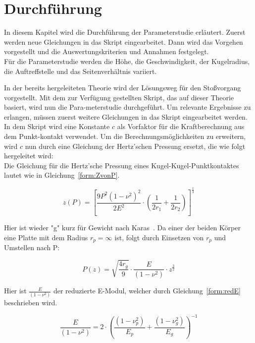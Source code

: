 \chapter{Durchführung}
\label{chap:Durchfuehrung}

In diesem Kapitel wird die Durchführung der Parameterstudie erläutert. Zuerst werden neue Gleichungen in das Skript eingearbeitet. Dann wird das Vorgehen vorgestellt und die Auswertungskriterien und Annahmen festgelegt.\\
Für die Parameterstudie werden die Höhe, die Geschwindigkeit, der Kugelradius, die Auftreffstelle und das Seitenverhältnis variiert.

In der bereits hergeleiteten Theorie wird der Lösungsweg für den Stoßvorgang vorgestellt. Mit dem zur Verfügung gestellten Skript, das auf dieser Theorie basiert, wird nun die Para-meterstudie durchgeführt. Um relevante Ergebnisse zu erlangen, müssen zuerst weitere Gleichungen in das Skript eingearbeitet werden.\\
In dem Skript wird eine Konstante $c$ als Vorfaktor für die Kraftberechnung aus dem Punkt-kontakt verwendet. Um die Berechnungsmöglichkeiten zu erweitern, wird $c$ nun durch eine Gleichung der Hertz'schen Pressung ersetzt, die wie folgt hergeleitet wird:\\

Die Gleichung für die Hertz'sche Pressung eines Kugel-Kugel-Punktkontaktes lautet wie in Gleichung~\ref{form:ZvonP}.

\begin{equation}
	\label{form:ZvonP}
	z(P) = \left[ \frac{9 P^{2} (1 - \nu^{2})^{2}}{2 E^{2}} \cdot \left( \frac{1}{2 r_{1}} + \frac{1}{2 r_{2}} \right) \right]^{\frac{1}{3}}
\end{equation}

Hier ist wieder "g" kurz für Gewicht nach Karas~\cite{Karas.1939}. Da einer der beiden Körper eine Platte mit dem Radius $r_{p} = \infty$ ist, folgt durch Einsetzen von $r_{p}$ und Umstellen nach P:

\begin{equation}
	\label{form:PvonZ}
	P(z) = \sqrt{\frac{4 r_{g}}{9}} \cdot \frac{E}{(1 - \nu^{2})} \cdot z^{\frac{3}{2}}
\end{equation}
	
Hier ist $\frac{E}{(1 - \nu^{2})}$ der reduzierte E-Modul, welcher durch Gleichung~\ref{form:redE} beschrieben wird.

\begin{equation}
	\label{form:redE}
	\frac{E}{(1 - \nu^{2})} = 2 \cdot \left( \frac{(1 - \nu_{p}^{2})}{E_{p}} + \frac{(1 - \nu_{g}^{2})}{E_{g}} \right)^{-1}
\end{equation} 

